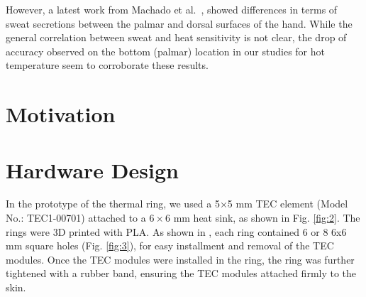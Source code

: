 \documentclass[preprint,12pt]{elsarticle}
\begin{document}
However, a latest work from Machado et al.~\cite{Machado2008}, showed differences in terms of sweat secretions between the palmar and dorsal surfaces of the hand.
While the general correlation between sweat and heat sensitivity is not clear, the drop of accuracy observed on the bottom (palmar) location in our studies for hot temperature seem to corroborate these results.

\section{Motivation}



\section{Hardware Design}


In the prototype of the thermal ring, we used a 5×5 mm TEC element (Model No.: TEC1-00701) attached to a $6 \times 6$ mm heat sink, as shown in Fig. \ref{fig:2}.  The rings were 3D printed with PLA. As shown in , each ring contained 6 or 8 6x6 mm square holes (Fig. \ref{fig:3}), for easy installment and removal of the TEC modules. Once the TEC modules were installed in the ring, the ring was further tightened with a rubber band, ensuring the TEC modules attached firmly to the skin.
\end{document}
